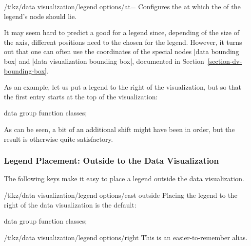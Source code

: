 \begin{key}{/tikz/data visualization/legend
    options/at=}
  Configures the  at which the  of the
  legend's node should lie.

  It may seem hard to predict a good  for a legend
  since, depending of the size of the axis, different positions need
  to the chosen for the legend. However, it turns out that one
  can often use the coordinates of the special nodes
  |data bounding box| and |data visualization bounding box|,
  documented in Section~\ref{section-dv-bounding-box}.
  
  As an example, let us put a legend to the right of the
  visualization, but so that the first entry starts at the top of the
  visualization: 
\begin{codeexample}[width=8cm]
\tikz \datavisualization [
  scientific axes, x axis={label=$x$},
  visualize as smooth line/.list=
    {log, lin, squared, exp},
  legend={anchor=north west, at=
    (data visualization bounding box.north east)},
  log=    {label in legend={text=$\log x$}},
  lin=    {label in legend={text=$x/2$}},
  squared={label in legend={text=$x^2$}},
  exp=    {label in legend={text=$e^x$}},
  style sheet=vary dashing]
data group {function classes};
\end{codeexample}
  As can be seen, a bit of an additional shift might have been in
  order, but the result is otherwise quite satisfactory.
\end{key}


\subsubsection{Legend Placement: Outside to the Data Visualization}
\label{section-dv-legend-outside}

The following keys make it easy to place a legend outside the data
visualization. 

\begin{key}{/tikz/data visualization/legend options/east outside}
  Placing the legend to the right of the data visualization is the default:
\begin{codeexample}[width=8cm]
\tikz \datavisualization [
  scientific axes, 
  visualize as smooth line/.list=
    {log, lin, squared, exp},
  legend=east outside,
  log=    {label in legend={text=$\log x$}},
  lin=    {label in legend={text=$x/2$}},
  squared={label in legend={text=$x^2$}},
  exp=    {label in legend={text=$e^x$}},
  style sheet=strong colors]
data group {function classes};
\end{codeexample}  

  \begin{key}{/tikz/data visualization/legend options/right}
    This is an easier-to-remember alias.
  \end{key}    
\end{key}

